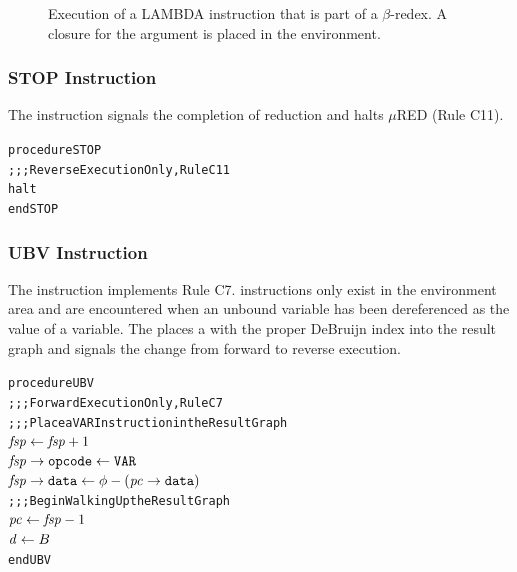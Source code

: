 
\begin{figure}[htbp]
\centering

\caption[Execution of LAMBDA instruction]{Execution of a LAMBDA instruction that is part of a \(\beta\)-redex. A closure for the argument is placed in the environment.}
\end{figure}


\subsubsection*{STOP Instruction}

The  instruction signals the completion of reduction and halts \(\mu\)RED (Rule C11).

\par\smallskip\noindent\begin{minipage}{\linewidth}
\begin{alltt}
procedure STOP
  \textrm{;;; Reverse Execution Only, Rule C11}
  halt
end STOP
\end{alltt}
\end{minipage}\par\smallskip


\subsubsection*{UBV Instruction}

The  instruction implements Rule C7.  instructions only exist in the environment area and are encountered when an unbound variable has been dereferenced as the value of a variable. The  places a  with the proper DeBruijn index into the result graph and signals the change from forward to reverse execution.

\par\smallskip\noindent\begin{minipage}{\linewidth}
\begin{alltt}
procedure UBV
  \textrm{;;; Forward Execution Only, Rule C7}
  \textrm{;;; Place a VAR Instruction in the Result Graph}
  \(\rt{fsp} \leftarrow \rt{fsp}+1\)
  \(\rtfield{fsp}{opcode} \leftarrow \mathtt{VAR}\)
  \(\rtfield{fsp}{data} \leftarrow \phi-(\rtfield{pc}{data})\)
  \textrm{;;; Begin Walking Up the Result Graph}
  \(\rt{pc} \leftarrow \rt{fsp}-1\)
  \(\rt{d} \leftarrow B\)
end UBV
\end{alltt}
\end{minipage}\par\smallskip


